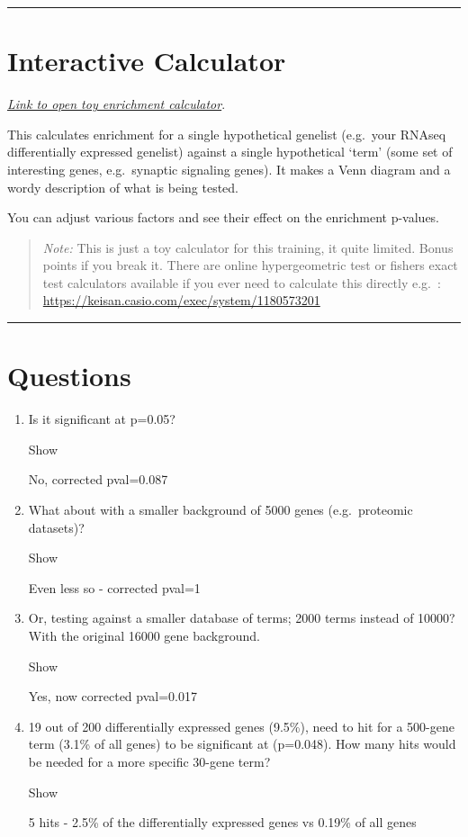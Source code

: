 \documentclass[
]{book}
\providecommand{\tightlist}{%
  \setlength{\itemsep}{0pt}\setlength{\parskip}{0pt}}
\begin{document}
\begin{center}\rule{0.5\linewidth}{0.5pt}\end{center}

\section{Interactive Calculator}\label{interactive-calculator}

\href{https://bioinformatics3.erc.monash.edu/rsconnect/content/241/}{\emph{Link to open toy enrichment calculator}}.

This calculates enrichment for a single hypothetical genelist (e.g.~your RNAseq differentially expressed genelist) against a single hypothetical `term' (some set of interesting genes, e.g.~synaptic signaling genes). It makes a Venn diagram and a wordy description of what is being tested.

You can adjust various factors and see their effect on the enrichment p-values.

\begin{quote}
\emph{Note:} This is just a toy calculator for this training, it quite limited. Bonus points if you break it. There are online hypergeometric test or fishers exact test calculators available if you ever need to calculate this directly e.g.~: \url{https://keisan.casio.com/exec/system/1180573201}
\end{quote}

\begin{center}\rule{0.5\linewidth}{0.5pt}\end{center}

\section{Questions}\label{questions}

\begin{enumerate}
\def\labelenumi{\arabic{enumi}.}
\tightlist
\item
  Is it significant at p=0.05?

  Show

  No, corrected pval=0.087
\item
  What about with a smaller background of 5000 genes (e.g.~proteomic datasets)?

  Show

  Even less so - corrected pval=1
\item
  Or, testing against a smaller database of terms; 2000 terms instead of 10000? With the original 16000 gene background.

  Show

  Yes, now corrected pval=0.017
\item
  19 out of 200 differentially expressed genes (9.5\%), need to hit for a 500-gene term (3.1\% of all genes) to be significant at (p=0.048). How many hits would be needed for a more specific 30-gene term?

  Show

  5 hits - 2.5\% of the differentially expressed genes vs 0.19\% of all genes
\end{enumerate}
\end{document}
